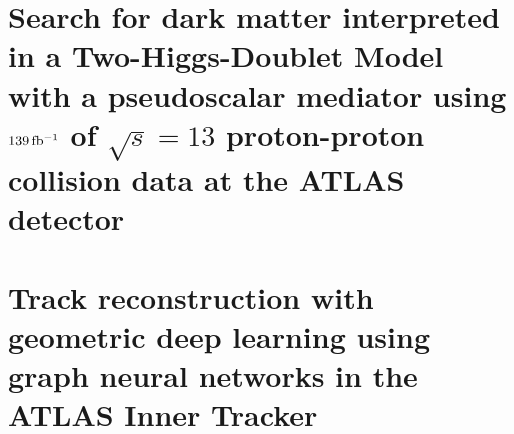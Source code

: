 \documentclass[12pt]{withesis}
\begin{document}

% 
\setcounter{page}{0}
% 
% 
% 



\setlength{\parskip}{1em}


\part{Search for dark matter interpreted in a Two-Higgs-Doublet Model with a pseudoscalar mediator using $139\, \mbox{fb\(^{-1}\)}$ of $\sqrt{s}=13$ \TeV proton-proton collision data at the ATLAS detector}





\part{Track reconstruction with geometric deep learning using graph neural networks in the ATLAS Inner Tracker}



% 



% 
% 

% 
% 


% 
% 
% 
% 

% 
% 

% 
\end{document}
